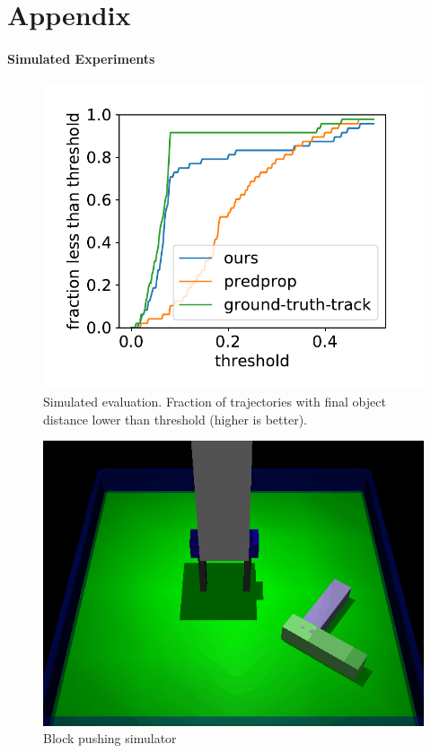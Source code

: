 \part*{Appendix}

\subsection{Simulated Experiments}

\begin{figure}
\centering
\includegraphics[width=0.4\columnwidth]{images/2obj_scores_ours-predprop-ground-truth-track.pdf}
\caption{\small{Simulated evaluation. Fraction of trajectories with final object distance lower than threshold (higher is better).}}
\label{fig:sim_bench}
\end{figure}

\begin{figure}
\centering
\includegraphics[width=0.3\columnwidth]{images/simulator.png}
\caption{\small{Block pushing simulator}}
\label{fig:sim}
\end{figure}


